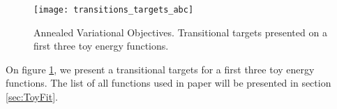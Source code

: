 \documentclass{article}
\begin{document}
\begin{figure}
    \caption{Annealed Variational Objectives. Transitional targets presented on a first three toy energy functions.}
    \centering
    \texttt{[image: transitions\_targets\_abc]}
    \label{toyabctrans}
\end{figure}

On figure \ref{toyabctrans}, we present a transitional targets for a first three toy energy functions. The list of all functions used in paper will be presented in section \ref{sec:ToyFit}.


    





\end{document}
